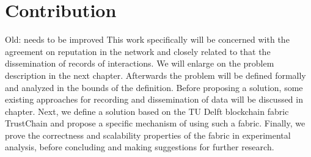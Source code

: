 \section{Contribution}
{\color{red} Old: needs to be improved}
This work specifically will be concerned with the agreement on reputation in the network and closely
related to that the dissemination of records of interactions. We
will enlarge on the problem description in the next chapter. Afterwards the problem will be defined
formally and analyzed in the bounds of the definition. Before proposing a solution, some existing
approaches for recording and dissemination of data will be discussed in chapter. Next, we define a
solution based on the TU Delft blockchain fabric TrustChain and propose a specific mechanism of 
using such a fabric. Finally, we prove the correctness and scalability properties of the fabric in
experimental analysis, before concluding and making suggestions for further research.